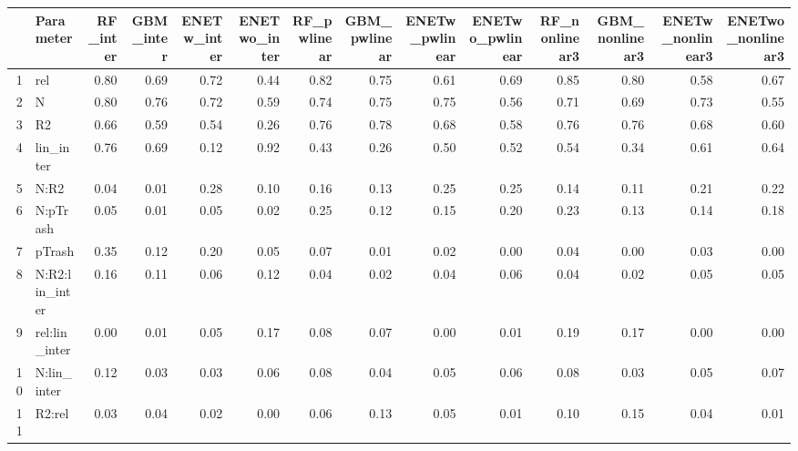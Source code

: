 \begin{table}[ht]
\centering
\begin{tabular}{rlrrrrrrrrrrrr}
  \hline
 & Parameter & RF\_inter & GBM\_inter & ENETw\_inter & ENETwo\_inter & RF\_pwlinear & GBM\_pwlinear & ENETw\_pwlinear & ENETwo\_pwlinear & RF\_nonlinear3 & GBM\_nonlinear3 & ENETw\_nonlinear3 & ENETwo\_nonlinear3 \\ 
  \hline
1 & rel & 0.80 & 0.69 & 0.72 & 0.44 & 0.82 & 0.75 & 0.61 & 0.69 & 0.85 & 0.80 & 0.58 & 0.67 \\ 
  2 & N & 0.80 & 0.76 & 0.72 & 0.59 & 0.74 & 0.75 & 0.75 & 0.56 & 0.71 & 0.69 & 0.73 & 0.55 \\ 
  3 & R2 & 0.66 & 0.59 & 0.54 & 0.26 & 0.76 & 0.78 & 0.68 & 0.58 & 0.76 & 0.76 & 0.68 & 0.60 \\ 
  4 & lin\_inter & 0.76 & 0.69 & 0.12 & 0.92 & 0.43 & 0.26 & 0.50 & 0.52 & 0.54 & 0.34 & 0.61 & 0.64 \\ 
  5 & N:R2 & 0.04 & 0.01 & 0.28 & 0.10 & 0.16 & 0.13 & 0.25 & 0.25 & 0.14 & 0.11 & 0.21 & 0.22 \\ 
  6 & N:pTrash & 0.05 & 0.01 & 0.05 & 0.02 & 0.25 & 0.12 & 0.15 & 0.20 & 0.23 & 0.13 & 0.14 & 0.18 \\ 
  7 & pTrash & 0.35 & 0.12 & 0.20 & 0.05 & 0.07 & 0.01 & 0.02 & 0.00 & 0.04 & 0.00 & 0.03 & 0.00 \\ 
  8 & N:R2:lin\_inter & 0.16 & 0.11 & 0.06 & 0.12 & 0.04 & 0.02 & 0.04 & 0.06 & 0.04 & 0.02 & 0.05 & 0.05 \\ 
  9 & rel:lin\_inter & 0.00 & 0.01 & 0.05 & 0.17 & 0.08 & 0.07 & 0.00 & 0.01 & 0.19 & 0.17 & 0.00 & 0.00 \\ 
  10 & N:lin\_inter & 0.12 & 0.03 & 0.03 & 0.06 & 0.08 & 0.04 & 0.05 & 0.06 & 0.08 & 0.03 & 0.05 & 0.07 \\ 
  11 & R2:rel & 0.03 & 0.04 & 0.02 & 0.00 & 0.06 & 0.13 & 0.05 & 0.01 & 0.10 & 0.15 & 0.04 & 0.01 \\ 
   \hline
\end{tabular}
\end{table}
